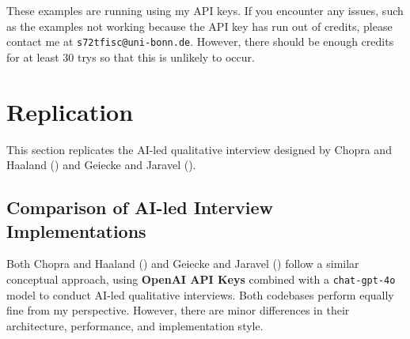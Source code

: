 \documentclass[
  letterpaper,
  DIV=11,
  numbers=noendperiod]{scrartcl}
\begin{document}
These examples are running using my API keys. If you encounter any
issues, such as the examples not working because the API key has run out
of credits, please contact me at \texttt{s72tfisc@uni-bonn.de}. However,
there should be enough credits for at least 30 trys so that this is
unlikely to occur.

\section{Replication}\label{sec-replication}

This section replicates the AI-led qualitative interview designed by
Chopra and Haaland () and
Geiecke and Jaravel ().

\subsection{Comparison of AI-led Interview
Implementations}\label{comparison-of-ai-led-interview-implementations}

Both Chopra and Haaland () and
Geiecke and Jaravel () follow a
similar conceptual approach, using \textbf{OpenAI API Keys} combined
with a \texttt{chat-gpt-4o} model to conduct AI-led qualitative
interviews. Both codebases perform equally fine from my perspective.
However, there are minor differences in their architecture, performance,
and implementation style.
\end{document}
